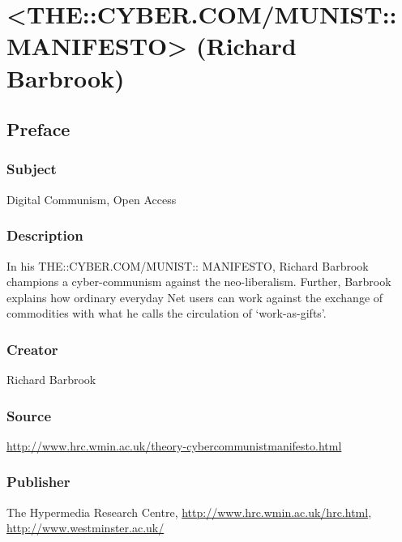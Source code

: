 \documentclass[letterpaper,12pt,english]{sphinxmanual}
\begin{document}
\chapter{\textless{}THE::CYBER.COM/MUNIST::MANIFESTO\textgreater{} (Richard Barbrook)}
\label{cybercommunist::doc}\label{cybercommunist:the-cyber-com-munist-manifesto-richard-barbrook}

\section{Preface}
\label{cybercommunist:preface}

\subsection{Subject}
\label{cybercommunist:subject}
Digital Communism, Open Access


\subsection{Description}
\label{cybercommunist:description}
In his THE::CYBER.COM/MUNIST:: MANIFESTO, Richard Barbrook champions a cyber-communism against the neo-liberalism. Further, Barbrook explains how ordinary everyday Net users can work against the exchange of commodities with what he calls the circulation of `work-as-gifts'.


\subsection{Creator}
\label{cybercommunist:creator}
Richard Barbrook


\subsection{Source}
\label{cybercommunist:source}
\href{http://www.hrc.wmin.ac.uk/theory-cybercommunistmanifesto.html}{http://www.hrc.wmin.ac.uk/theory-cybercommunistmanifesto.html}


\subsection{Publisher}
\label{cybercommunist:publisher}
The Hypermedia Research Centre, \href{http://www.hrc.wmin.ac.uk/hrc.html}{http://www.hrc.wmin.ac.uk/hrc.html}, \href{http://www.westminster.ac.uk/}{http://www.westminster.ac.uk/}
\end{document}
